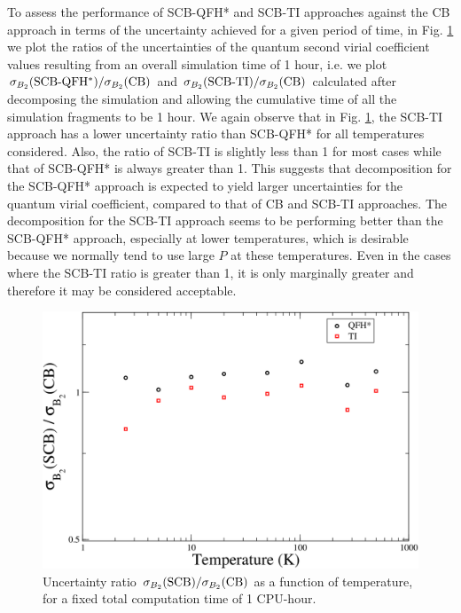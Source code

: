     To assess the performance of SCB-QFH* and SCB-TI approaches against the CB approach in terms of the uncertainty achieved for a given period of time, in Fig. \ref{uncB21Hr} we plot the ratios of the uncertainties of the quantum second virial coefficient values resulting from an overall simulation time of 1 hour, i.e. we plot $\sigma_{B_2}{\rm (SCB\textrm{-}QFH^*)}/\sigma_{B_2}{\rm (CB)}$ and $\sigma_{B_2}{\rm (SCB\textrm{-}TI)}/\sigma_{B_2}{\rm (CB)}$ calculated after decomposing the simulation and allowing the cumulative time of all the simulation fragments to be 1 hour. We again observe that in Fig. \ref{uncB21Hr}, the SCB-TI approach has a lower uncertainty ratio than SCB-QFH* for all temperatures considered. Also, the ratio of SCB-TI is slightly less than 1 for most cases while that of SCB-QFH* is always greater than 1. This suggests that decomposition for the SCB-QFH* approach is expected to yield larger uncertainties for the quantum virial coefficient, compared to that of CB and SCB-TI approaches. The decomposition for the SCB-TI approach seems to be performing better than the SCB-QFH* approach, especially at lower temperatures, which is desirable because we normally tend to use large $P$ at these temperatures. Even in the cases where the SCB-TI ratio is greater than 1, it is only marginally greater and therefore it may be considered acceptable.
    \begin{figure}
        \centering
        \includegraphics[scale=0.3,keepaspectratio]{Chapter-3/Figures/uncB21Hr.png}
        \caption{Uncertainty ratio $\sigma_{B_2}{\rm(SCB)}/\sigma_{B_2}{\rm{(CB)}}$ as a function of temperature, for a fixed total computation time of 1 CPU-hour.} \label{uncB21Hr}
    \end{figure}
